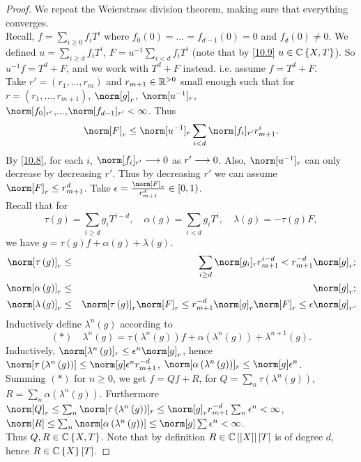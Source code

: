 \begin{proof}
We repeat the Weierstrass division theorem, making sure that everything
converges.\\
Recall, $f=\sum_{i\geq0}f_{i}T^{i}$ where $f_{0}\left(0\right)=...=f_{d-1}\left(0\right)=0$
and $f_{d}\left(0\right)\neq0$. We defined $u=\sum_{i\geq d}f_{i}T^{i}$,
$F=u^{-1}\sum_{i<d}f_{i}T^{i}$ (note that by \eqref{10.9} $u\in\mathbb{C}\left\{ X,T\right\} $).
So $u^{-1}f=T^{d}+F$, and we work with $T^{d}+F$ instead. i.e. assume
$f=T^{d}+F$.\\
Take $r'=\left(r_{1},...,r_{m}\right)$ and $r_{m+1}\in\mathbb{R}^{>0}$ small
enough such that for $r=\left(r_{1},...,r_{m+1}\right)$, $\norm[g]_{r}$,
$\norm[u^{-1}]_{r}$, \\
$\norm[f_{0}]_{r'}$,...,$\norm[f_{d-1}]_{r'}<\infty$. Thus 
\[
\norm[F]_{r}\leq\norm[u^{-1}]_{r}\sum_{i<d}\norm[f_{i}]_{r'}r_{m+1}^{i}.
\]
By \eqref{10.8}, for each $i$, $\norm[f_{i}]_{r'}\lto0$ as $r'\longrightarrow0$.
Also, $\norm[u^{-1}]_{r}$ can only decrease by decreasing $r'$.
Thus by decreasing $r'$ we can assume $\norm[F]_{r}\leq r_{m+1}^{d}$.
Take $\epsilon=\frac{\norm[F]_{r}}{r_{m+1}^{d}}\in\left[0,1\right)$.
\\
Recall that for 
\[
\tau\left(g\right)=\sum_{i\geq d}g_{i}T^{i-d},\quad\alpha\left(g\right)=\sum_{i<d}g_{i}T^{i},\quad\lambda\left(g\right)=-\tau\left(g\right)F,
\]
we have $g=\tau\left(g\right)f+\alpha\left(g\right)+\lambda\left(g\right)$.
\begin{eqnarray*}
\norm[\tau\left(g\right)]_{r} & \leq & \sum_{i\geq d}\norm[g_{i}]_{r}r_{m+1}^{i-d}<r_{m+1}^{-d}\norm[g]_{r};\\
\norm[\alpha\left(g\right)]_{r} & \leq & \norm[g]_{r};\\
\norm[\lambda\left(g\right)]_{r} & \leq & \norm[\tau\left(g\right)]_{r}\norm[F]_{r}\leq r_{m+1}^{-d}\norm[g]_{r}\norm[F]_{r}\leq\epsilon\norm[g]_{r}.
\end{eqnarray*}
Inductively define $\lambda^{n}\left(g\right)$ according to 
\[
\left(\ast\right)\quad\lambda^{n}\left(g\right)=\tau\left(\lambda^{n}\left(g\right)\right)f+\alpha\left(\lambda^{n}\left(g\right)\right)+\lambda^{n+1}\left(g\right).
\]
Inductively, $\norm[\lambda^{n}\left(g\right)]_{r}\leq\epsilon^{n}\norm[g]_{r}$,
hence $\norm[\tau\left(\lambda^{n}\left(g\right)\right)]\leq\norm[g]\epsilon^{n}r_{m+1}^{-d}$,
$\norm[\alpha\left(\lambda^{n}\left(g\right)\right)]_{r}\leq\norm[g]\epsilon^{n}$.\\
Summing $\left(\ast\right)$ for $n\geq0$, we get $f=Qf+R$, for
$Q=\sum_{n}\tau\left(\lambda^{n}\left(g\right)\right)$, $R=\sum_{n}\alpha\left(\lambda^{n}\left(g\right)\right)$.
Furthermore $\norm[Q]_{r}\leq\sum_{n}\norm[\tau\left(\lambda^{n}\left(g\right)\right)]_{r}\leq\norm[g]_{r}r_{m+1}^{-d}\sum_{n}\epsilon^{n}<\infty$,
$\norm[R]\leq\sum_{n}\norm[\alpha\left(\lambda^{n}\left(g\right)\right)]\leq\norm[g]\sum\epsilon^{n}<\infty$.
\\
Thus $Q,R\in\mathbb{C}\left\{ X,T\right\} $. Note that by definition $R\in\mathbb{C}\left[\left[X\right]\right]\left[T\right]$
is of degree $d$, hence $R\in\mathbb{C}\left\{ X\right\} \left[T\right]$.\end{proof}
